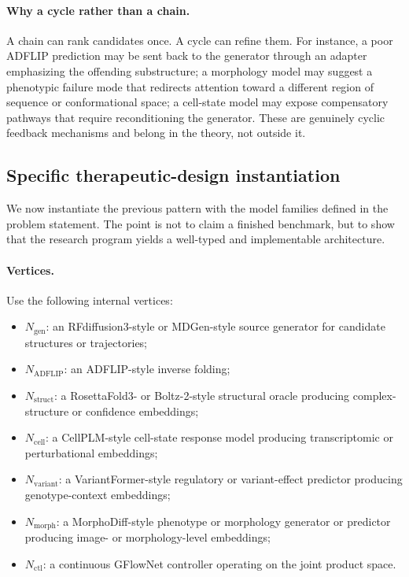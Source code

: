 \documentclass[11pt]{article}
\theoremstyle{definition}
\theoremstyle{plain}
\theoremstyle{remark}
\begin{document}
\paragraph{Why a cycle rather than a chain.}
A chain can rank candidates once.
A cycle can refine them.
For instance, a poor ADFLIP prediction may be sent back to the generator through an adapter emphasizing the offending substructure; a morphology model may suggest a phenotypic failure mode that redirects attention toward a different region of sequence or conformational space; a cell-state model may expose compensatory pathways that require reconditioning the generator.
These are genuinely cyclic feedback mechanisms and belong in the theory, not outside it.

\subsection{Specific therapeutic-design instantiation}
\label{sec:therapeutic-cycle}

We now instantiate the previous pattern with the model families defined in the problem statement. The point is not to claim a finished benchmark, but to show that the research program yields a well-typed and implementable architecture.

\paragraph{Vertices.}
Use the following internal vertices:
\begin{itemize}[leftmargin=2em]
\item $N_{\mathrm{gen}}$: an RFdiffusion3-style or MDGen-style source generator for candidate structures or trajectories;
\item $N_{\mathrm{ADFLIP}}$: an ADFLIP-style inverse folding; 
\item $N_{\mathrm{struct}}$: a RosettaFold3- or Boltz-2-style structural oracle producing complex-structure or confidence embeddings;
\item $N_{\mathrm{cell}}$: a CellPLM-style cell-state response model producing transcriptomic or perturbational embeddings;
\item $N_{\mathrm{variant}}$: a VariantFormer-style regulatory or variant-effect predictor producing genotype-context embeddings;
\item $N_{\mathrm{morph}}$: a MorphoDiff-style phenotype or morphology generator or predictor producing image- or morphology-level embeddings;
\item $N_{\mathrm{ctl}}$: a continuous GFlowNet controller operating on the joint product space.
\end{itemize}
\end{document}
